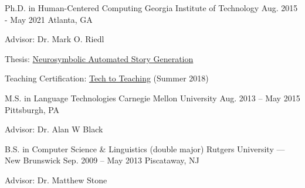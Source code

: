 {\color{black}\fontsize{12pt}{1em}} 


\begin{cventries}

  \cventry
    {Ph.D. in Human-Centered Computing} %
    {Georgia Institute of Technology} %
    {Aug. 2015 - May 2021} %
    {Atlanta, GA} %
    {
      \begin{cvitems} %
        \item {Advisor: Dr. Mark O. Riedl}
        \item {Thesis: \href{https://smartech.gatech.edu/handle/1853/64643}{Neurosymbolic Automated Story Generation}}
        \item{Teaching Certification: \href{https://ctl.gatech.edu/tech-teaching}{Tech to Teaching} (Summer 2018)}
      \end{cvitems}
    }



 \cventry
    {M.S. in Language Technologies} %
    {Carnegie Mellon University} %
    {Aug. 2013 – May 2015} %
    {Pittsburgh, PA} %
    {      
      \begin{cvitems} %
        \item {Advisor: Dr. Alan W Black}
      \end{cvitems}
    }


  \cventry
    {B.S. in Computer Science \& Linguistics (double major)} %
    {Rutgers University --- New Brunswick} %
    {Sep. 2009 – May 2013} %
    {Piscataway, NJ} %
    {      
      \begin{cvitems} %
      \item {Advisor: Dr. Matthew Stone}
      \end{cvitems}
    }%
\end{cventries}
